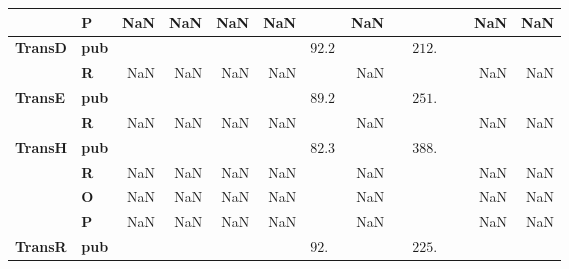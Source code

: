\begin{tabular}{llrrrrrrr}
       & \textbf{P} &                         NaN &                         NaN &                         NaN &         NaN &                         NaN &                                        NaN &      NaN \\\midrule
\textbf{TransD} & \textbf{pub} &                             &                             &                             &             &  $92.2\phantom{0 \pm 0.00}$ &  $\phantom{00}212.\phantom{00 \pm 000.00}$ &          \\
       & \textbf{R} &                         NaN &                         NaN &                         NaN &         NaN &                         NaN &                                        NaN &      NaN \\\midrule
\textbf{TransE} & \textbf{pub} &                             &                             &                             &             &  $89.2\phantom{0 \pm 0.00}$ &  $\phantom{00}251.\phantom{00 \pm 000.00}$ &          \\
       & \textbf{R} &                         NaN &                         NaN &                         NaN &         NaN &                         NaN &                                        NaN &      NaN \\\midrule
\textbf{TransH} & \textbf{pub} &                             &                             &                             &             &  $82.3\phantom{0 \pm 0.00}$ &  $\phantom{00}388.\phantom{00 \pm 000.00}$ &          \\
       & \textbf{R} &                         NaN &                         NaN &                         NaN &         NaN &                         NaN &                                        NaN &      NaN \\
       & \textbf{O} &                         NaN &                         NaN &                         NaN &         NaN &                         NaN &                                        NaN &      NaN \\
       & \textbf{P} &                         NaN &                         NaN &                         NaN &         NaN &                         NaN &                                        NaN &      NaN \\\midrule
\textbf{TransR} & \textbf{pub} &                             &                             &                             &             &  $92.\phantom{00 \pm 0.00}$ &  $\phantom{00}225.\phantom{00 \pm 000.00}$ &          \\

\end{tabular}
